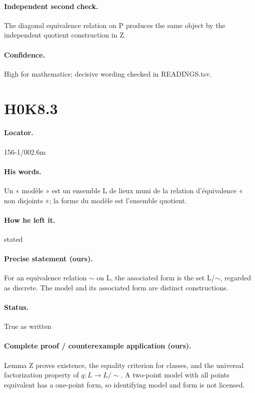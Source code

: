 \paragraph{Independent second check.} The diagonal equivalence relation on P produces the same object by the independent quotient construction in Z.

\paragraph{Confidence.} High for mathematics; decisive wording checked in READINGS.tsv.

\section*{H0K8.3}\label{statement:H0K8.3}
\paragraph{Locator.} 156-1/002.6m

\paragraph{His words.} Un « modèle » est un ensemble L de lieux muni de la relation d’équivalence « non disjoints »; la forme du modèle est l’ensemble quotient.

\paragraph{How he left it.} stated

\paragraph{Precise statement (ours).} For an equivalence relation \ensuremath{\sim} on L, the associated form is the set L/\ensuremath{\sim}, regarded as discrete. The model and its associated form are distinct constructions.

\paragraph{Status.} True as written

\paragraph{Complete proof / counterexample application (ours).} Lemma Z proves existence, the equality criterion for classes, and the universal factorization property of \(q:L\to L/{\sim}\). A two-point model with all points equivalent has a one-point form, so identifying model and form is not licensed.

